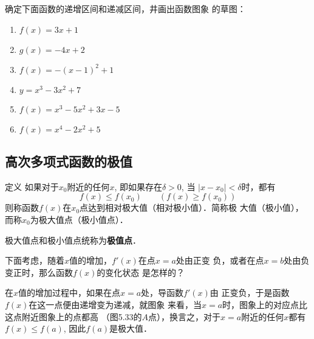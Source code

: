\begin{ex}
    确定下面函数的递增区间和递减区间，井画出函数图象
    的草图：
\begin{multicols}{2}
\begin{enumerate}
    \item $f(x)=3x+1$
    \item $g(x)=-4x+2$
    \item $f(x)=-(x-1)^2+1$
    \item $y=x^3-3x^2+7$
    \item $f(x)=x^3-5x^2+3x-5$
    \item $f(x)=x^4-2x^2+5$
\end{enumerate}
\end{multicols}
\end{ex}

\subsection{高次多项式函数的极值}

\begin{blk}{定义}
   如果对于$x_0$附近的任何$x$, 即如果存在$\delta>0$, 当
$|x-x_0|<\delta$时，都有
\[f(x)\le f(x_0)\qquad (f(x)\ge f(x_0))\]
则称函数$f(x)$在$x_0$点达到相对极大值（相对极小值）．简称极
大值（极小值），而称$x_0$为极大值点（极小值点）．

极大值点和极小值点统称为\textbf{极值点}．
\end{blk}

下面考虑，随着$x$值的增加，$f'(x)$在点$x=a$处由正变
负，或者在点$x=b$处由负变正时，那么函数$f(x)$的变化状态
是怎样的？

在$x$值的增加过程中，如果在点$x=a$处，导函数$f'(x)$由
正变负，于是函数$f(x)$在这一点便由递增变为递减，就图象
来看，当$x=a$时，图象上的对应点比这点附近图象上的点都高
（图5.33的$A$点），换言之，对于$x=a$附近的任何$x$都有$f(x)\le 
f(a)$, 因此$f(a)$是极大值．
\begin{figure}[htp]
    \centering

    \caption{}
\end{figure}


